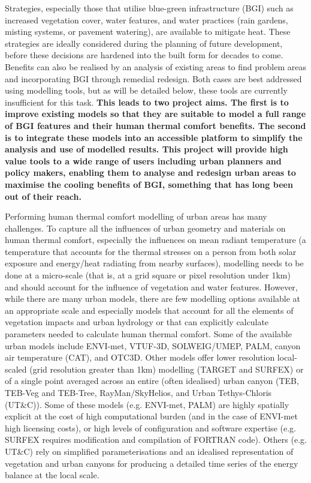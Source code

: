 Strategies, especially those that utilise blue-green infrastructure (BGI)\cite{Norton2015,Bowler2010,Gunawardena2017,Newton2020} such as increased vegetation cover, water features, and water practices (rain gardens, misting systems, or pavement watering), are available to mitigate heat. These strategies are ideally considered during the planning of future development, before these decisions are hardened into the built form for decades to come. Benefits can also be realised by an analysis of existing areas to find problem areas and incorporating BGI through remedial redesign. Both cases are best addressed using modelling tools, but as will be detailed below, these tools are currently insufficient for this task. \textbf{This leads to two project aims. The first is to improve existing models so that they are suitable to model a full range of BGI features and their human thermal comfort benefits. The second is to integrate these models into an accessible platform to simplify the analysis and use of modelled results. This project will provide high value tools to a wide range of users including urban planners and policy makers, enabling them to analyse and redesign urban areas to maximise the cooling benefits of BGI, something that has long been out of their reach.}


Performing human thermal comfort modelling of urban areas has many challenges. To capture all the influences of urban geometry and materials on human thermal comfort, especially the influences on mean radiant temperature\cite{Kantor2011} (a temperature that accounts for the thermal stresses on a person from both solar exposure and energy/heat radiating from nearby surfaces), modelling needs to be done at a micro-scale (that is, at a grid square or pixel resolution under 1km) and should account for the influence of vegetation and water features. However, while there are many urban models, there are few modelling options available at an appropriate scale and especially models that account for all the elements of vegetation impacts and urban hydrology or that can explicitly calculate parameters needed to calculate human thermal comfort. Some of the available urban models include ENVI-met\cite{Bruse1999}, VTUF-3D\cite{Nice2018a}, SOLWEIG/UMEP\cite{Lindberg2018}, PALM\cite{Dominik2019}, canyon air temperature (CAT)\cite{Erell2006}, and OTC3D\cite{Nazarian2018}. Other models offer lower resolution local-scaled (grid resolution greater than 1km) modelling (TARGET\cite{Broadbent2019c} and SURFEX\cite{Masson2013}) or of a single point averaged across an entire (often idealised) urban canyon (TEB\cite{Masson2002a},  TEB-Veg and TEB-Tree\cite{Lemonsu2012,Redon2020}, RayMan\cite{Matzarakis2010}/SkyHelios\cite{Matzarakis2011}, and Urban Tethys-Chloris (UT\&C)\cite{Meili2020}). Some of these models (e.g. ENVI-met, PALM) are highly spatially explicit at the cost of high computational burden (and in the case of ENVI-met high licensing costs), or high levels of configuration and software expertise (e.g. SURFEX requires modification and compilation of FORTRAN code). Others (e.g. UT\&C) rely on simplified parameterisations and an idealised representation of vegetation and urban canyons for producing a detailed time series of the energy balance at the local scale. 



